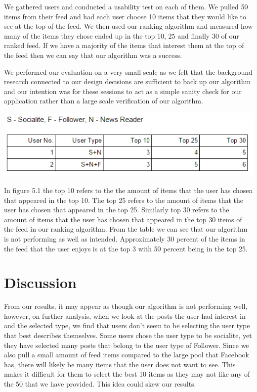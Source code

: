 We gathered users and conducted a usability test on each of them. We pulled 50 items from their feed and had each user choose 10 items that they would like to see at the top of the feed. We then used our ranking algorithm and measured how many of the items they chose ended up in the top 10, 25 and finally 30 of our ranked feed. If we have a majority of the items that interest them at the top of the feed then we can say that our algorithm was a success.

We performed our evaluation on a very small scale as we felt that the background research connected to our design decisions are sufficient to back up our algorithm and our intention was for these sessions to act as a simple sanity check for our application rather than a large scale verification of our algorithm.

\begin{center}
\includegraphics[scale=0.8]{images/results.png}
\end{center}

In figure 5.1 the top 10 refers to the the amount of items that the user has chosen that appeared in the top 10. The top 25 refers to the amount of items that the user has chosen that appeared in the top 25. Similarly top 30 refers to the amount of items that the user has chosen that appeared in the top 30 items of the feed in our ranking algorithm. From the table we can see that our algorithm is not performing as well as intended. Approximately 30 percent of the items in the feed that the user enjoys is at the top 3 with 50 percent  being in the top 25. 

\section{Discussion}

From our results, it may appear as though our algorithm is not performing well, however, on further analysis, when we look at the posts the user had interest in and the selected type, we find that users don’t seem to be selecting the user type that best describes themselves. Some users chose the user type to be socialite, yet they have selected many posts that belong to the user type of Follower. Since we also pull a small amount of feed items compared to the large pool that Facebook has, there will likely be many items that the user does not want to see. This makes it difficult for them to select the best 10 items as they may not like any of the 50 that we have provided. This idea could skew our results.
